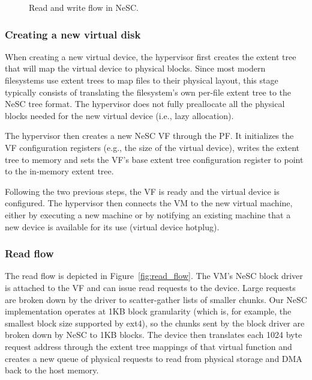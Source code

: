 \begin{figure}[t]
{%
    \label{fig:write_flow}
  }
  \caption{Read and write flow in NeSC.\label{fig:flow}}
\end{figure}

\subsubsection*{Creating a new virtual disk}

When creating a new virtual device, the hypervisor first creates the extent tree that will map the virtual device to physical blocks. Since most modern filesystems use extent trees to map files to their physical layout, this stage typically consists of translating the filesystem's own per-file extent tree to the NeSC tree format. The hypervisor does not fully preallocate all the physical blocks needed for the new virtual device (i.e., lazy allocation). 

The hypervisor then creates a new NeSC VF through the PF. It initializes the VF configuration registers (e.g., the size of the virtual device), writes the extent tree to memory and sets the VF's base extent tree configuration register to point to the in-memory extent tree.

Following the two previous steps, the VF is ready and the virtual device is configured. The hypervisor then connects the VM to the new virtual machine, either by executing a new machine or by notifying an existing machine that a new device is available for its use (virtual device hotplug).

\subsubsection*{Read flow}
The read flow is depicted in Figure~\ref{fig:read_flow}. The VM's NeSC block driver is attached to the VF and can issue read requests to the device. Large requests are broken down by the driver to scatter-gather lists of smaller chunks. Our NeSC implementation operates at 1KB block granularity (which is, for example, the smallest block size supported by ext4), so the chunks sent by the block driver are broken down by NeSC to 1KB blocks.
The device then translates each 1024 byte request address through the extent tree mappings of
that virtual function and creates a new queue of physical requests to read from physical storage
and DMA back to the host memory.

